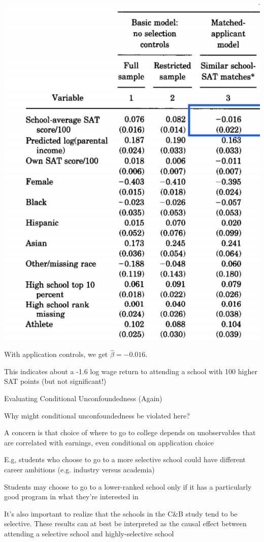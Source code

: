 \documentclass[11pt,english,handout]{beamer}
\newenvironment{wideitemize}{\itemize\addtolength{\itemsep}{10pt}}{\enditemize}
\newenvironment{wideitemizeshort}{\itemize}{\enditemize}
\begin{document}
\begin{frame}
	\includegraphics[width =0.5\linewidth]{dk-results-table-reg2}
	
	\begin{wideitemizeshort}
		\item
		With application controls, we get $\hat\beta =-0.016$. 
		
		\pause
		\item
		This indicates about a  -1.6 log wage return to attending a school with 100 higher SAT points (but not significant!)
	\end{wideitemizeshort}
\end{frame}

\begin{frame}{Evaluating Conditional Unconfoundedness (Again)}

\begin{wideitemize}
	\item
	Why might conditional unconfoundedness be violated here? 
	
	\pause
	\item
	A concern is that choice of where to go to college depends on unobservables that are correlated with earnings, even conditional on application choice\smallskip

		\begin{wideitemize}
			\item
			E.g, students who choose to go to a more selective school could have different career ambitions (e.g. industry versus academia)
			
			\pause
			\item
			Students may choose to go to a lower-ranked school only if it has a particularly good program in what they're interested in
			
	 \end{wideitemize}
 
 	\pause
 	\item
 	It's also important to realize that the schools in the C\&B study tend to be selective. These results can at best be interpreted as the causal effect between attending a selective school and highly-selective school
\end{wideitemize}
	
\end{frame}
\end{document}
